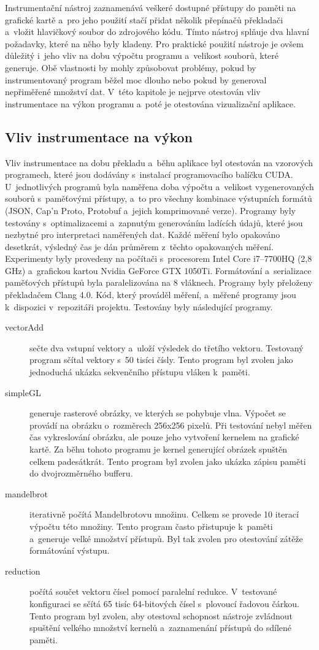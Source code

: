 Instrumentační nástroj zaznamenává veškeré dostupné přístupy do paměti na grafické kartě a~pro jeho použití stačí přidat několik přepínačů překladači a~vložit hlavičkový soubor do zdrojového kódu. Tímto nástroj splňuje dva hlavní požadavky, které na něho byly kladeny. Pro praktické použití nástroje je ovšem důležitý i~jeho vliv na dobu výpočtu programu a~velikost souborů, které generuje. Obě vlastnosti by mohly způsobovat problémy, pokud by instrumentovaný program běžel moc dlouho nebo pokud by generoval nepřiměřené množství dat. V~této kapitole je nejprve otestován vliv instrumentace na výkon programu a~poté je otestována vizualizační aplikace.

\subsection{Vliv instrumentace na výkon}
Vliv instrumentace na dobu překladu a~běhu aplikace byl otestován na vzorových programech, které jsou dodávány s~instalací programovacího balíčku CUDA. U~jednotlivých programů byla naměřena doba výpočtu a~velikost vygenerovaných souborů s~paměťovými přístupy, a~to pro všechny kombinace výstupních formátů (JSON, Cap'n Proto, Protobuf a~jejich komprimované verze). Programy byly testovány s~optimalizacemi a~zapnutým generováním ladících údajů, které jsou nezbytné pro interpretaci naměřených dat. Každé měření bylo opakováno desetkrát, výsledný čas je dán průměrem z~těchto opakovaných měření. Experimenty byly provedeny na počítači s~procesorem Intel Core i7–7700HQ (2,8 GHz) a~grafickou kartou Nvidia GeForce GTX 1050Ti. Formátování a~serializace paměťových přístupů byla paralelizována na 8 vláknech. Programy byly přeloženy překladačem Clang 4.0. Kód, který prováděl měření, a~měřené programy jsou k~dispozici v~repozitáři projektu. Testovány byly následující programy.
\begin{description}
	\item[vectorAdd] sečte dva vstupní vektory a~uloží výsledek do třetího vektoru. Testovaný program sčítal vektory s~50 tisíci čísly. Tento program byl zvolen jako jednoduchá ukázka sekvenčního přístupu vláken k~paměti.
	\item[simpleGL] generuje rasterové obrázky, ve kterých se pohybuje vlna. Výpočet se provádí na obrázku o~rozměrech 256x256 pixelů. Při testování nebyl měřen čas vykreslování obrázku, ale pouze jeho vytvoření kernelem na grafické kartě. Za běhu tohoto programu je kernel generující obrázek spuštěn celkem padesátkrát. Tento program byl zvolen jako ukázka zápisu paměti do dvojrozměrného bufferu.
	\item[mandelbrot] iterativně počítá Mandelbrotovu množinu. Celkem se provede 10 iterací výpočtu této množiny. Tento program často přistupuje k~paměti a~generuje velké množství přístupů. Byl tak zvolen pro otestování zátěže formátování výstupu.
	\item[reduction] počítá součet vektoru čísel pomocí paralelní redukce. V~testované konfiguraci se sčítá 65 tisíc 64-bitových čísel s~plovoucí řadovou čárkou. Tento program byl zvolen, aby otestoval schopnost nástroje zvládnout spuštění velkého množství kernelů a~zaznamenání přístupů do sdílené paměti.
\end{description}

